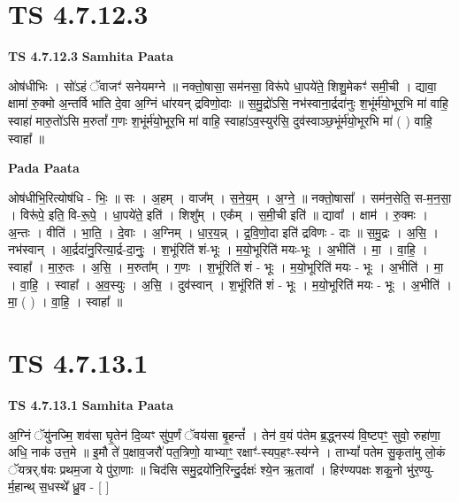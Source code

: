 \documentclass[17pt]{extarticle}
\begin{document}

\section{ TS 4.7.12.3 }

\textbf{TS 4.7.12.3 } \newline
\textbf{Samhita Paata} \newline

ओष॑धीभिः । सो॑ऽहं ॅवाजꣳ॑ सनेयमग्ने ॥ नक्तो॒षासा॒ सम॑नसा॒ विरू॑पे धा॒पये॑ते॒ शिशु॒मेकꣳ॑ समी॒ची । द्यावा॒ क्षामा॑ रु॒क्मो अ॒न्तर्वि भा॑ति दे॒वा अ॒ग्निं धा॑रयन् द्रविणो॒दाः ॥ स॒मु॒द्रो॑ऽसि॒ नभ॑स्वाना॒र्द्रदा॑नुः श॒भूंर्म॑यो॒भूर॒भि मा॑ वाहि॒ स्वाहा॑ मारु॒तो॑ऽसि म॒रुतां᳚ ग॒णः श॒भूंर्म॑यो॒भूर॒भि मा॑ वाहि॒ स्वाहा॑ऽव॒स्युर॑सि॒ दुव॑स्वाञ्छ॒भूंर्म॑यो॒भूरभि मा॑ ( ) वाहि॒ स्वाहा᳚ ॥ \newline

\textbf{Pada Paata} \newline

ओष॑धीभि॒रित्योष॑धि - भिः॒ ॥ सः । अ॒हम् । वाज᳚म् । स॒ने॒य॒म् । अ॒ग्ने॒ ॥ नक्तो॒षासा᳚ । सम॑न॒सेति॒ स-म॒न॒सा॒ । विरू॑पे॒ इति॒ वि-रू॒पे॒ । धा॒पये॑ते॒ इति॑ । शिशु᳚म् । एक᳚म् । स॒मी॒ची इति॑ ॥ द्यावा᳚ । क्षाम॑ । रु॒क्मः । अ॒न्तः । वीति॑ । भा॒ति॒ । दे॒वाः । अ॒ग्निम् । धा॒र॒य॒न्न् । द्र॒वि॒णो॒दा इति॑ द्रविणः - दाः ॥ स॒मु॒द्रः । अ॒सि॒ । नभ॑स्वान् । आ॒र्द्रदा॑नु॒रित्या॒र्द्र-दा॒नुः॒ । श॒भूंरिति॑ शं-भूः । म॒यो॒भूरिति॑ मयः-भूः । अ॒भीति॑ । मा॒ । वा॒हि॒ । स्वाहा᳚ । मा॒रु॒तः । अ॒सि॒ । म॒रुता᳚म् । ग॒णः । श॒भूंरिति॑ शं - भूः । म॒यो॒भूरिति॑ मयः - भूः । अ॒भीति॑ । मा॒ । वा॒हि॒ । स्वाहा᳚ । अ॒व॒स्युः । अ॒सि॒ । दुव॑स्वान् । श॒भूंरिति॑ शं - भूः । म॒यो॒भूरिति॑ मयः - भूः । अ॒भीति॑ । मा॒ ( ) । वा॒हि॒ । स्वाहा᳚ ॥  \newline





\section{ TS 4.7.13.1 }

\textbf{TS 4.7.13.1 } \newline
\textbf{Samhita Paata} \newline

अ॒ग्निं ॅयु॑नज्मि॒ शव॑सा घृ॒तेन॑ दि॒व्यꣳ सु॑प॒र्णं ॅवय॑सा बृ॒हन्तं᳚ । तेन॑ व॒यं प॑तेम ब्र॒द्ध्नस्य॑ वि॒ष्टपꣳ॒॒ सुवो॒ रुहा॑णा॒ अधि॒ नाक॑ उत्त॒मे ॥ इ॒मौ ते॑ प॒क्षाव॒जरौ॑ पत॒त्रिणो॒ याभ्याꣳ॒॒ रक्षाꣳ॑-स्यप॒हꣳ-स्य॑ग्ने । ताभ्यां᳚ पतेम सु॒कृता॑मु लो॒कं ॅयत्रर्.ष॑यः प्रथम॒जा ये पु॑रा॒णाः ॥ चिद॑सि समु॒द्रयो॑नि॒रिन्दु॒र्दक्षः॑ श्ये॒न ऋ॒तावा᳚ । हिर॑ण्यपक्षः शकु॒नो भु॑र॒ण्यु-र्म॒हान्थ् स॒धस्थे᳚ ध्रु॒व - [  ] \newline
\end{document}
